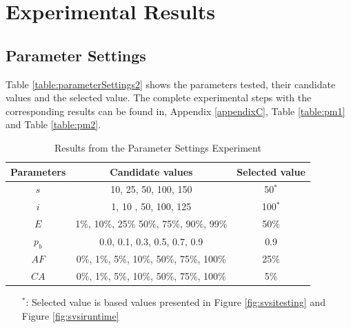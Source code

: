 \section{Experimental Results}
\label{sec:expResults}

\subsection{Parameter Settings}
\label{subsec:parameterSettings_results}

Table \vref{table:parameterSettings2} shows the parameters tested, their candidate values and the selected value. The complete experimental steps with the corresponding results can be found in, Appendix \ref{appendixC}, Table \vref{table:pm1} and Table \vref{table:pm2}. 

    \begin{table}[H]
    \centering
    \begin{tabular}{|c|c||c|}
    \hline
    Parameters & Candidate values & Selected value\\
    \hline
    $s$ & 10, 25, 50, 100, 150 & 50$^*$ \\
    $i$ & 1, 10 , 50, 100, 125 & 100$^*$ \\
    $E$ & 1\%, 10\%, 25\% 50\%, 75\%, 90\%, 99\% & 50\% \\
    $p_{b}$ & 0.0, 0.1, 0.3, 0.5, 0.7, 0.9 & 0.9 \\
    $AF$ & 0\%, 1\%, 5\%, 10\%, 50\%, 75\%, 100\% & 25\% \\
    $CA$ & 0\%, 1\%, 5\%, 10\%, 50\%, 75\%, 100\% & 5\% \\
    \hline
    \end{tabular}
    \caption {Results from the Parameter Settings Experiment}
    \begin{itemize}[noitemsep]
    \item[$^*$:]  Selected value is based values presented in Figure \vref{fig:svsitesting} and Figure \vref{fig:svsiruntime} 
    \end{itemize}
    \label{table:parameterSettings2}
    \end{table}
    

